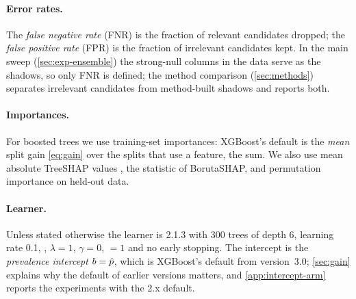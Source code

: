 \paragraph{Error rates.} The \emph{false negative rate} (FNR) is the fraction of relevant candidates dropped; the \emph{false positive rate} (FPR) is the fraction of irrelevant candidates kept. In the main sweep (\cref{sec:exp-ensemble}) the strong-null columns in the data serve as the shadows, so only FNR is defined; the method comparison (\cref{sec:methods}) separates irrelevant candidates from method-built shadows and reports both.

\paragraph{Importances.} For boosted trees we use training-set importances: XGBoost's default  is the \emph{mean} split gain \eqref{eq:gain} over the splits that use a feature,  the sum. We also use mean absolute TreeSHAP values \citep{lundberg2020local}, the statistic of BorutaSHAP, and permutation importance on held-out data.

\paragraph{Learner.} Unless stated otherwise the learner is  2.1.3 with 300 trees of depth 6, learning rate 0.1, , $\lambda = 1$, $\gamma = 0$, ${}=1$ and no early stopping. The intercept is the \emph{prevalence intercept} $b = \hat p$, which is XGBoost's default from version~3.0; \cref{sec:gain} explains why the default of earlier versions matters, and \cref{app:intercept-arm} reports the experiments with the 2.x default.
